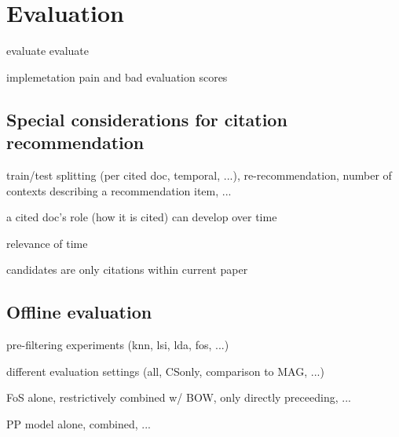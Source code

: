 \chapter{Evaluation}\label{chap:evaluation}
evaluate evaluate

implemetation pain and bad evaluation scores\cite{Beel2017}

\section{Special considerations for citation recommendation}
train/test splitting (per cited doc, temporal, ...), re-recommendation, number of contexts describing a recommendation item, ...

a cited doc's role (how it is cited) can develop over time\cite{Swales1986,He2018}

relevance of time\cite{Beel2017a}

candidates are only citations within current paper\cite{Duma2014}

\section{Offline evaluation}
pre-filtering experiments (knn\cite{Bhagavatula2018}, lsi, lda, fos, ...)

different evaluation settings (all, CSonly, comparison to MAG, ...)

FoS alone, restrictively combined w/ BOW, only directly preceeding, ...

PP model alone, combined, ...

